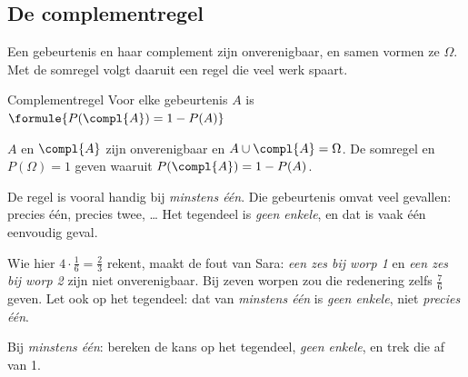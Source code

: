 \subsection{De complementregel}

Een gebeurtenis en haar complement zijn onverenigbaar, en samen vormen ze $\Omega$. Met de somregel volgt daaruit een regel die veel werk spaart.

\begin{theorie}
\begin{stelling}{Complementregel}
Voor elke gebeurtenis $A$ is \quad $\formule{P(\compl{A}) = 1 - P(A)}$
\end{stelling}

\begin{bewijs}
$A$ en $\compl{A}$ zijn onverenigbaar en $A \cup \compl{A} = \Omega$. De somregel en $P(\Omega) = 1$ geven
waaruit $P(\compl{A}) = 1 - P(A)$.
\end{bewijs}
\end{theorie}

De regel is vooral handig bij \textit{minstens één}. Die gebeurtenis omvat veel gevallen: precies één, precies twee, \ldots{} Het tegendeel is \textit{geen enkele}, en dat is vaak één eenvoudig geval.


Wie hier $4 \cdot \frac16 = \frac23$ rekent, maakt de fout van Sara: \textit{een zes bij worp 1} en \textit{een zes bij worp 2} zijn niet onverenigbaar. Bij zeven worpen zou die redenering zelfs $\frac76$ geven. Let ook op het tegendeel: dat van \textit{minstens één} is \textit{geen enkele}, niet \textit{precies één}.

\begin{werkwijze}
Bij \textit{minstens één}: bereken de kans op het tegendeel, \textit{geen enkele}, en trek die af van 1.
\end{werkwijze}

